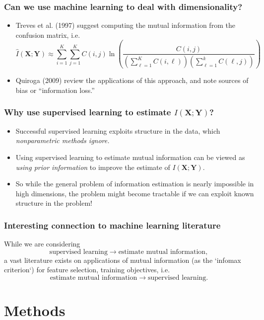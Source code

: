 \documentclass{beamer}
\newcommand{\bX}{\boldsymbol{X}}
\newcommand{\bY}{\boldsymbol{Y}}
\begin{document}
\begin{frame}
\frametitle{Can we use machine learning to deal with dimensionality?}
\begin{itemize}
\item Treves et al. (1997) suggest computing the mutual information from the confusion matrix,
i.e.
\[
\hat{I}(\bX; \bY) \approx 
\sum_{i=1}^K \sum_{j = 1}^K 
C(i, j) \ln\left(\frac{C(i, j)}{\left(\sum_{\ell=1}^K C(i, \ell)\right) \left(\sum_{\ell=1}^k C(\ell, j) \right)}\right)
\]
\item Quiroga (2009) review the applications of this approach, and note sources of bias or ``information loss.''
\end{itemize}
\end{frame}

\begin{frame}
\frametitle{Why use supervised learning to estimate $I(\bX; \bY)$?}

\begin{itemize}
\item Successful supervised learning exploits structure in the data, which \emph{nonparametric methods ignore.}
\item Using supervised learning to estimate mutual information can be viewed as \emph{using prior information} to improve the estimate of $I(\bX; \bY)$.
\item So while the general problem of information estimation is nearly impossible in high dimensions,
the problem might become tractable if we can exploit known structure in the problem!
\end{itemize}
\end{frame}

\begin{frame}
\frametitle{Interesting connection to machine learning literature}

While we are considering
\[
\text{supervised learning} \to \text{estimate mutual information},
\]
a vast literature exists on applications of mutual information (as the `infomax criterion`) for feature selection, training objectives, i.e.
\[
\text{estimate mutual information} \to \text{supervised learning}.
\]
\end{frame}

\section{Methods}
\end{document}
